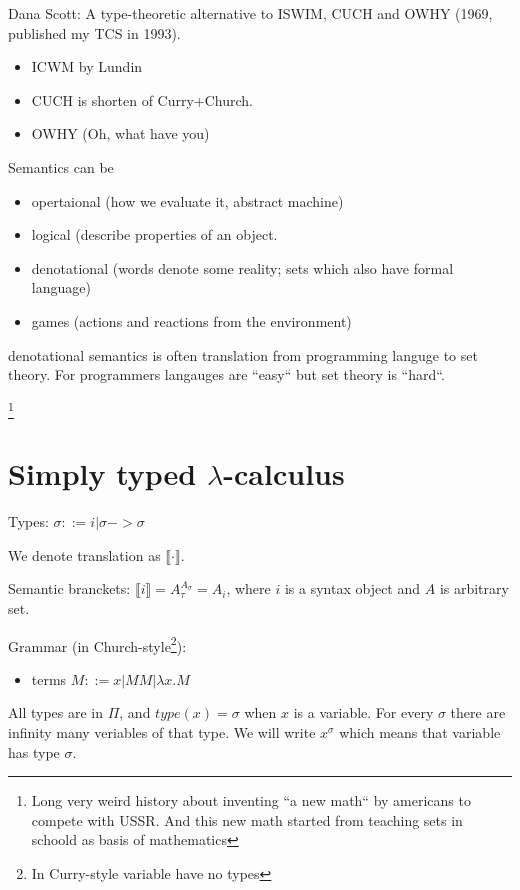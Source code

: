 \documentclass[a4paper,10pt]{book}
\begin{document}
Dana Scott:  A type-theoretic alternative to ISWIM, CUCH and OWHY (1969, published my TCS in 1993).

\begin{itemize}
\item ICWM by Lundin
\item CUCH is shorten of Curry+Church.
\item OWHY (Oh, what have you)
\end{itemize}

Semantics can be 
\begin{itemize}
\item opertaional (how we evaluate it, abstract machine)
\item logical (describe properties of an object.
\item denotational (words denote some reality; sets which also have formal language)
\item games (actions and reactions from the environment)
\end{itemize}

denotational semantics is often translation from programming languge to set theory. For programmers 
langauges are ``easy`` but set theory is ``hard``.

\footnote{Long very weird history about inventing ``a new math`` by americans to compete with USSR.
And this new math started from teaching sets in schoold as basis of mathematics}


\chapter{Simply typed $\lambda$-calculus}

Types: $\sigma ::= i | \sigma -> \sigma$

We denote translation as $\llbracket \cdot \rrbracket$.

Semantic branckets: $\llbracket i \rrbracket = A_{\tau}^{A_\sigma} = A_i $, 
where $i$ is a syntax object and $A$ is arbitrary set.

Grammar (in Church-style\footnote{In Curry-style variable have no types}): 
\begin{itemize}
 \item terms $M ::= x | MM | \lambda x . M$
\end{itemize}
All types are in $\Pi$, and $type(x) = \sigma$ when $x$ is a variable. For every $\sigma$ there 
are infinity many veriables of that type. We will write $x^\sigma$ which means that variable has 
type $\sigma$.
\end{document}
